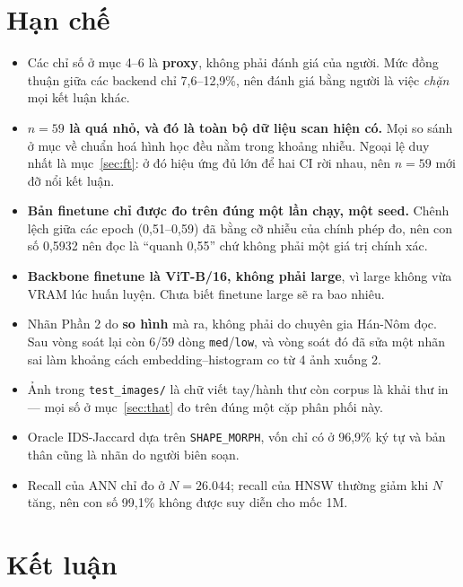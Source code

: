 \documentclass[11pt,a4paper]{article}
\newcommand{\code}[1]{\texttt{#1}}
\begin{document}
\section{Hạn chế}

\begin{itemize}
  \item Các chỉ số ở mục 4--6 là \textbf{proxy}, không phải đánh giá của người. Mức đồng thuận giữa
        các backend chỉ 7,6--12,9\%, nên đánh giá bằng người là việc \emph{chặn} mọi kết luận khác.
  \item \textbf{$n = 59$ là quá nhỏ, và đó là toàn bộ dữ liệu scan hiện có.} Mọi so sánh ở mục về
        chuẩn hoá hình học đều nằm trong khoảng nhiễu. Ngoại lệ duy nhất là mục~\ref{sec:ft}: ở đó
        hiệu ứng đủ lớn để hai CI rời nhau, nên $n = 59$ mới đỡ nổi kết luận.
  \item \textbf{Bản finetune chỉ được đo trên đúng một lần chạy, một seed.} Chênh lệch giữa các
        epoch (0,51--0,59) đã bằng cỡ nhiễu của chính phép đo, nên con số 0,5932 nên đọc là ``quanh
        0,55'' chứ không phải một giá trị chính xác.
  \item \textbf{Backbone finetune là ViT-B/16, không phải large}, vì large không vừa VRAM lúc huấn
        luyện. Chưa biết finetune large sẽ ra bao nhiêu.
  \item Nhãn Phần 2 do \textbf{so hình} mà ra, không phải do chuyên gia Hán-Nôm đọc. Sau vòng soát
        lại còn 6/59 dòng \code{med}/\code{low}, và vòng soát đó đã sửa một nhãn sai làm khoảng cách
        embedding--histogram co từ 4 ảnh xuống 2.
  \item Ảnh trong \code{test\_images/} là chữ viết tay/hành thư còn corpus là khải thư in --- mọi số
        ở mục~\ref{sec:that} đo trên đúng một cặp phân phối này.
  \item Oracle IDS-Jaccard dựa trên \code{SHAPE\_MORPH}, vốn chỉ có ở 96,9\% ký tự và bản thân cũng
        là nhãn do người biên soạn.
  \item Recall của ANN chỉ đo ở $N = 26.044$; recall của HNSW thường giảm khi $N$ tăng, nên con số
        99,1\% không được suy diễn cho mốc 1M.
\end{itemize}

\section{Kết luận}
\end{document}
